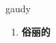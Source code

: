 
\begin{frame}
{\huge gaudy}
\begin{center}
\begin{enumerate}\Large
  \item \textbf{俗丽的}
\end{enumerate}
\end{center}
\end{frame}
